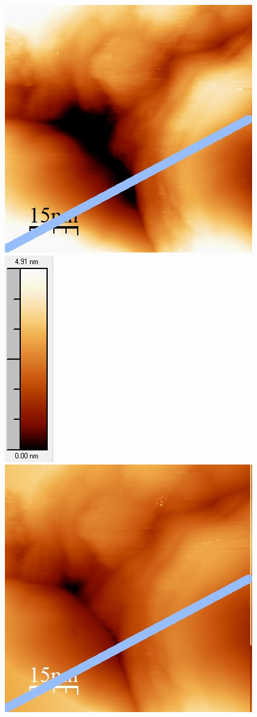 \documentclass[12pt,a4paper]{article}
\begin{document}
\begin{figure}[H]
\centering
\includegraphics[scale=0.6]{Bilder/Anhang/Zeit/2_Zeit_vor.jpg}
\includegraphics[scale=0.6]{Bilder/Anhang/Zeit/2_Zeit_vor_Skala.jpg}
\includegraphics[scale=0.6]{Bilder/Anhang/Zeit/2_Zeit_nach.jpg}

\end{figure}
\end{document}
